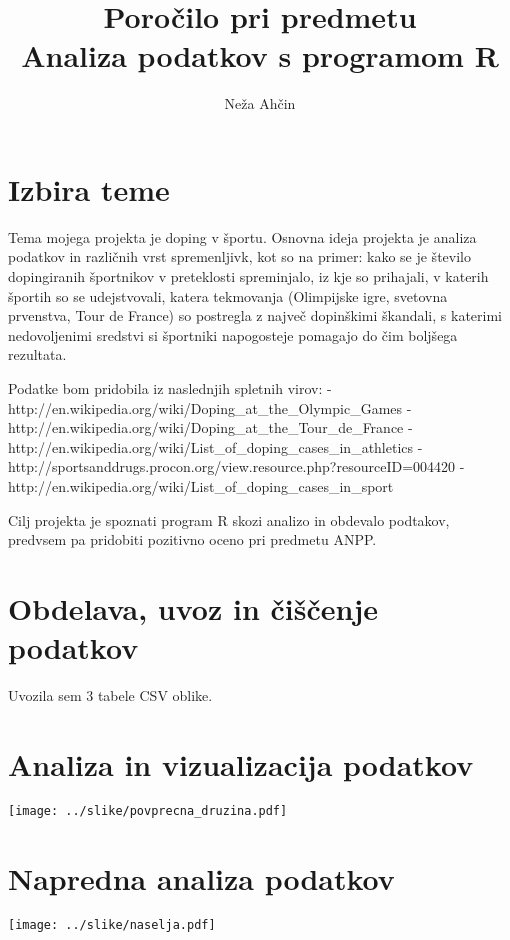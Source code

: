 \documentclass[11pt,a4paper]{article}
\begin{document}
\title{Poročilo pri predmetu \\
Analiza podatkov s programom R}
\author{Neža Ahčin}
\maketitle

\section{Izbira teme}
Tema mojega projekta je doping v športu. Osnovna ideja projekta je analiza podatkov in različnih vrst spremenljivk, kot so na primer: kako se je število dopingiranih športnikov v preteklosti spreminjalo, iz kje so prihajali, v katerih športih so se udejstvovali, katera tekmovanja (Olimpijske igre, svetovna prvenstva, Tour de France) so postregla z največ dopinškimi škandali, s katerimi nedovoljenimi sredstvi si športniki napogosteje pomagajo do čim boljšega rezultata.

Podatke bom pridobila iz naslednjih spletnih virov:
- http://en.wikipedia.org/wiki/Doping_at_the_Olympic_Games
- http://en.wikipedia.org/wiki/Doping_at_the_Tour_de_France
- http://en.wikipedia.org/wiki/List_of_doping_cases_in_athletics
- http://sportsanddrugs.procon.org/view.resource.php?resourceID=004420
- http://en.wikipedia.org/wiki/List_of_doping_cases_in_sport

Cilj projekta je spoznati program R skozi analizo in obdevalo podtakov, predvsem pa pridobiti pozitivno oceno pri predmetu ANPP.

\section{Obdelava, uvoz in čiščenje podatkov}
Uvozila sem 3 tabele CSV oblike.

\section{Analiza in vizualizacija podatkov}

\texttt{[image: ../slike/povprecna\_druzina.pdf]}

\section{Napredna analiza podatkov}

\texttt{[image: ../slike/naselja.pdf]}
\end{document}
